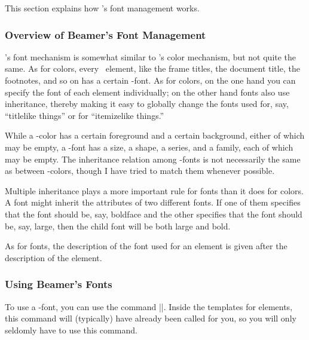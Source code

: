 This section explains how \beamer's font management works.

\subsubsection{Overview of Beamer's Font Management}

\beamer's font mechanism is somewhat similar to \beamer's color
mechanism, but not quite the same. As for colors, every \beamer\
element, like the frame titles, the document title, the footnotes, and
so on has a certain \beamer-font. As for colors, on the one hand you
can specify the font of each element individually; on the other hand
fonts also use inheritance, thereby making it easy to globally change
the fonts used for, say, ``titlelike things'' or for ``itemizelike
things.''

While a \beamer-color has a certain foreground and a certain
background, either of which may be empty, a \beamer-font has a size, a
shape, a series, and a family, each of which may be empty. The
inheritance relation among \beamer-fonts is not necessarily the same
as between \beamer-colors, though I have tried to match them whenever
possible.

Multiple inheritance plays a more important rule for
fonts than it does for colors. A font might inherit the attributes of
two different fonts. If one of them specifies that the font should be,
say, boldface and the other specifies that the font should be, say,
large, then the child font will be both large and bold.

As for fonts, the description of the font used for an element is given
after the description of the element.


\subsubsection{Using Beamer's Fonts}

To use a \beamer-font, you can use the command
|\usebeamerfont|. Inside the templates for elements, this command will
(typically) have already been called for you, so you will only
seldomly have to use this command.

